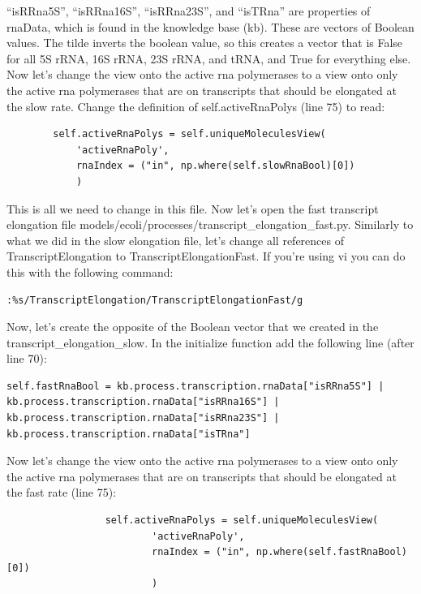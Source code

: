 \documentclass[12pt]{article}
\begin{document}
“isRRna5S”, “isRRna16S”, “isRRna23S”, and “isTRna” are properties of rnaData, which is found in the knowledge base (kb). These are vectors of Boolean values. The tilde inverts the boolean value, so this creates a vector that is False for all 5S rRNA, 16S rRNA, 23S rRNA, and tRNA, and True for everything else.
Now let’s change the view onto the active rna polymerases to a view onto only the active rna polymerases that are on transcripts that should be elongated at the slow rate. Change the definition of self.activeRnaPolys (line 75) to read:

\begin{lstlisting}
		self.activeRnaPolys = self.uniqueMoleculesView(
			'activeRnaPoly',
			rnaIndex = ("in", np.where(self.slowRnaBool)[0])
			)
\end{lstlisting}

This is all we need to change in this file. Now let’s open the fast transcript elongation file models/ecoli/processes/transcript\_elongation\_fast.py. Similarly to what we did in the slow elongation file, let’s change all references of TranscriptElongation to TranscriptElongationFast. If you’re using vi you can do this with the following command:

\lstset{language=bash}
\begin{lstlisting}
:%s/TranscriptElongation/TranscriptElongationFast/g
\end{lstlisting}

Now, let’s create the opposite of the Boolean vector that we created in the transcript\_elongation\_slow. In the initialize function add the following line (after line 70):

\lstset{language=Python}
\begin{lstlisting}
self.fastRnaBool = kb.process.transcription.rnaData["isRRna5S"] | kb.process.transcription.rnaData["isRRna16S"] | kb.process.transcription.rnaData["isRRna23S"] | kb.process.transcription.rnaData["isTRna"]
\end{lstlisting}

Now let’s change the view onto the active rna polymerases to a view onto only the active rna polymerases that are on transcripts that should be elongated at the fast rate (line 75):

\begin{lstlisting}
                 self.activeRnaPolys = self.uniqueMoleculesView(
                         'activeRnaPoly',
                         rnaIndex = ("in", np.where(self.fastRnaBool)[0])
                         )
\end{lstlisting}
\end{document}
